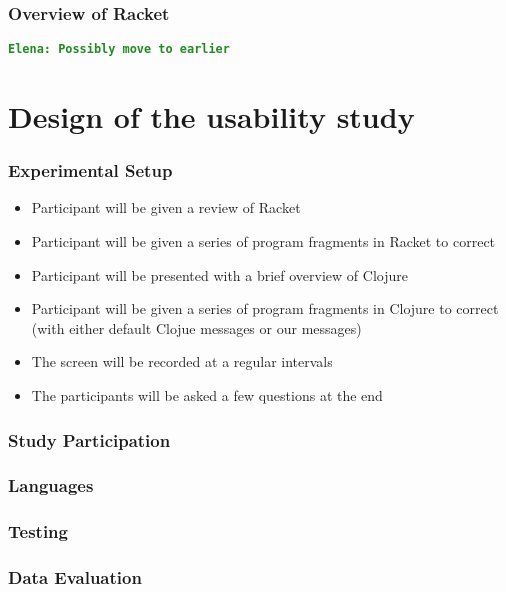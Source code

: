 \documentclass{beamer}
\newcommand{\comment}[1]{{\bf \tt  {#1}}}
\newcommand{\emcomment}[1]{\textcolor{ForestGreen}{\comment{Elena: {#1}}}}
\begin{document}
\begin{frame}
\frametitle{Overview of Racket}
\emcomment{Possibly move to earlier}
\end{frame}


\section{Design of the usability study} 

\begin{frame}
\frametitle{Experimental Setup}
\begin{itemize}
\item Participant will be given a review of Racket
\item Participant will be given a series of program fragments in Racket to correct
\item Participant will be presented with a brief overview of Clojure
\item Participant will be given a series of  program fragments in Clojure to correct (with either default Clojue messages or our messages) 
\item The screen will be recorded at a regular intervals
\item The participants will be asked a few questions at the end
\end{itemize}
\end{frame}

\begin{frame}
\frametitle{Study Participation}
\end{frame}

\begin{frame}
\frametitle{Languages}
\end{frame}

\begin{frame}
\frametitle{Testing}
\end{frame}

\begin{frame}
\frametitle{Data Evaluation}
\end{frame}
\end{document}
